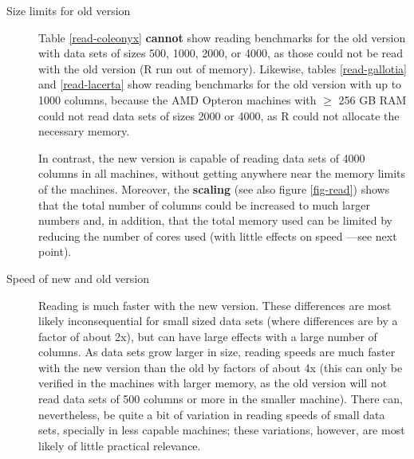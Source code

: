 \documentclass[a4paper,11pt]{article}
\begin{document}
\begin{description}
\item[Size limits for old version] Table
\ref{read-coleonyx} \textbf{cannot} show reading benchmarks for the old
version with data sets of sizes 500, 1000, 2000, or 4000, as those could
not be read with the old version (R run out of memory). Likewise, tables
\ref{read-gallotia} and \ref{read-lacerta} show reading benchmarks for the
old version with up to 1000 columns, because the AMD Opteron machines with
$\ge$ 256 GB RAM could not read data sets of sizes 2000 or
4000, as R could not allocate the necessary memory.%

In contrast, the new version is capable of reading data sets of 4000
columns in all machines, without getting anywhere near the memory limits
of the machines. Moreover, the \textbf{scaling} (see also figure
\ref{fig-read}) shows that the total number of columns could be increased
to much larger numbers and, in addition, that the total memory used can be
limited by reducing the number of cores used (with little effects on speed
---see next point).%


\item[Speed of new and old version] Reading is much faster with the new
  version. These differences are most likely inconsequential for small
  sized data sets (where differences are by a factor of about 2x), but can
  have large effects with a large number of columns.  As data sets grow
  larger in size, reading speeds are much faster with the new version than
  the old by factors of about 4x (this can only be verified in the
  machines with larger memory, as the old version will not read data sets
  of 500 columns or more in the smaller machine). There can,
  nevertheless, be quite a bit of variation in reading speeds of small
  data sets, specially in less capable machines; these variations,
  however, are most likely of little practical relevance.


\end{description}
\end{document}

